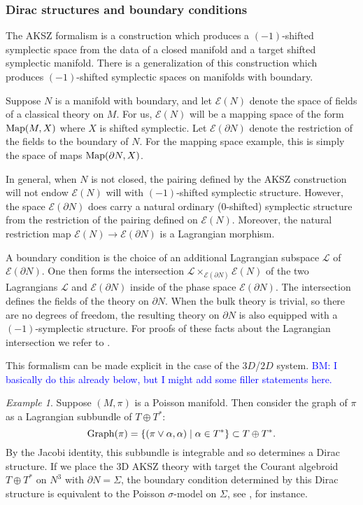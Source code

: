 \documentclass[letterpaper,12pt]{article}
\newcommand{\TT}{{T\oplus T^*}}
\newcommand{\cE}{\mathcal{E}}
\theoremstyle{definition}
\theoremstyle{remark}
\theoremstyle{examples}
\newtheorem{Ex}[theorem]{Example}
\def\brian{\textcolor{blue}{BM: }\textcolor{blue}}
\begin{document}
\subsubsection{Dirac structures and boundary conditions}

The AKSZ formalism is a construction which produces a $(-1)$-shifted symplectic space from the data of a closed manifold and a target shifted symplectic manifold. 
There is a generalization of this construction which produces $(-1)$-shifted symplectic spaces on manifolds with boundary. 

Suppose $N$ is a manifold with boundary, and let $\cE(N)$ denote the space of fields of a classical theory on $M$. 
For us, $\cE(N)$ will be a mapping space of the form ${\rm Map}(M, X)$ where $X$ is shifted symplectic. 
Let $\cE(\partial N)$ denote the restriction of the fields to the boundary of $N$. 
For the mapping space example, this is simply the space of maps ${\rm Map}(\partial N, X)$.

In general, when $N$ is not closed, the pairing defined by the AKSZ construction will not endow $\cE(N)$ will with $(-1)$-shifted symplectic structure. 
However, the space $\cE(\partial N)$ does carry a natural ordinary ($0$-shifted) symplectic structure from the restriction of the pairing defined on $\cE(N)$. 
Moreover, the natural restriction map $\cE(N) \to \cE(\partial N)$ is a Lagrangian morphism.

\def\cL{\mathcal{L}}

A boundary condition is the choice of an additional Lagrangian subspace $\cL$ of $\cE(\partial N)$.
One then forms the intersection $\cL \times_{\cE(\partial N)} \cE(N)$ of the two Lagrangians $\cL$ and $\cE(\partial N)$ inside of the phase space $\cE(\partial N)$. 
The intersection defines the fields of the theory on $\partial N$. 
When the bulk theory is trivial, so there are no degrees of freedom, the resulting theory on $\partial N$ is also equipped with a $(-1)$-symplectic structure. 
For proofs of these facts about the Lagrangian intersection we refer to \cite{Calaque,PTVV}.

This formalism can be made explicit in the case of the $3D$/$2D$ system. \brian{I basically do this already below, but I might add some filler statements here.}

\begin{Ex}
Suppose $(M, \pi)$ is a Poisson manifold. 
Then consider the graph of $\pi$ as a Lagrangian subbundle of $\TT$:
\[
{\rm Graph}(\pi) = \{(\pi \vee \alpha , \alpha) \; | \; \alpha \in T^* \} \subset \TT .
\]
By the Jacobi identity, this subbundle is integrable and so determines a Dirac structure. 
If we place the 3D AKSZ theory with target the Courant algebroid $\TT$ on $N^3$ with $\partial N = \Sigma$, the boundary condition determined by this Dirac structure is equivalent to the Poisson $\sigma$-model on $\Sigma$, see \cite{KSSdirac}, for instance.
\end{Ex}
\end{document}
